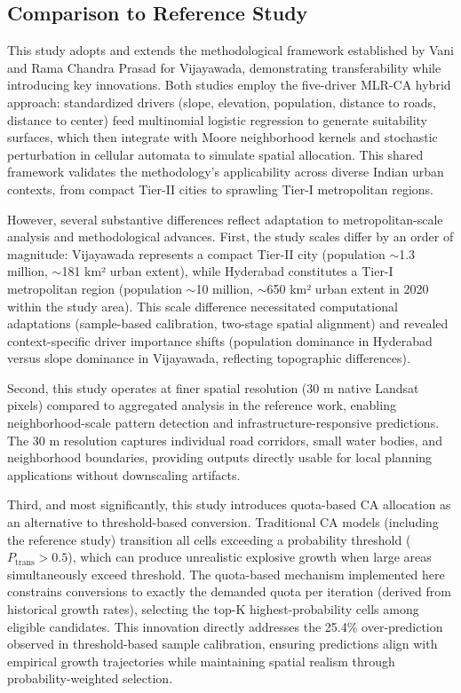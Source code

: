 \documentclass[12pt,a4paper]{article}
\begin{document}
\subsection{Comparison to Reference Study}

This study adopts and extends the methodological framework established by Vani and Rama Chandra Prasad \cite{vani2022} for Vijayawada, demonstrating transferability while introducing key innovations. Both studies employ the five-driver MLR-CA hybrid approach: standardized drivers (slope, elevation, population, distance to roads, distance to center) feed multinomial logistic regression to generate suitability surfaces, which then integrate with Moore neighborhood kernels and stochastic perturbation in cellular automata to simulate spatial allocation. This shared framework validates the methodology's applicability across diverse Indian urban contexts, from compact Tier-II cities to sprawling Tier-I metropolitan regions.

However, several substantive differences reflect adaptation to metropolitan-scale analysis and methodological advances. First, the study scales differ by an order of magnitude: Vijayawada represents a compact Tier-II city (population $\sim$1.3 million, $\sim$181 km² urban extent), while Hyderabad constitutes a Tier-I metropolitan region (population $\sim$10 million, $\sim$650 km² urban extent in 2020 within the study area). This scale difference necessitated computational adaptations (sample-based calibration, two-stage spatial alignment) and revealed context-specific driver importance shifts (population dominance in Hyderabad versus slope dominance in Vijayawada, reflecting topographic differences).

Second, this study operates at finer spatial resolution (30 m native Landsat pixels) compared to aggregated analysis in the reference work, enabling neighborhood-scale pattern detection and infrastructure-responsive predictions. The 30 m resolution captures individual road corridors, small water bodies, and neighborhood boundaries, providing outputs directly usable for local planning applications without downscaling artifacts.

Third, and most significantly, this study introduces quota-based CA allocation as an alternative to threshold-based conversion. Traditional CA models (including the reference study) transition all cells exceeding a probability threshold ($P_{\text{trans}} > 0.5$), which can produce unrealistic explosive growth when large areas simultaneously exceed threshold. The quota-based mechanism implemented here constrains conversions to exactly the demanded quota per iteration (derived from historical growth rates), selecting the top-K highest-probability cells among eligible candidates. This innovation directly addresses the 25.4\% over-prediction observed in threshold-based sample calibration, ensuring predictions align with empirical growth trajectories while maintaining spatial realism through probability-weighted selection.
\end{document}
